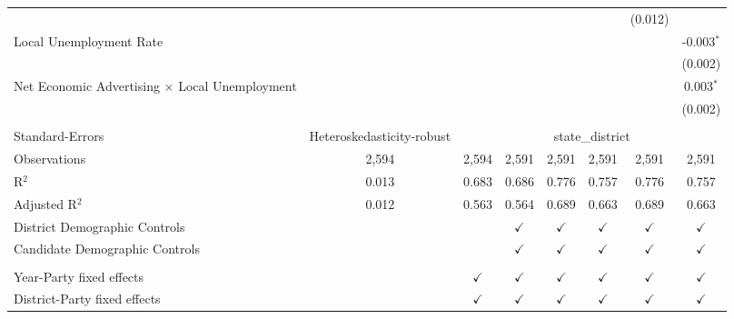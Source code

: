\begin{table}[htbp]
\begin{tabular}{lccccccc}
                                                    &               &               &               &               &               & (0.012)       &   \\   
      Local Unemployment Rate                       &               &               &               &               &               &               & -0.003$^{*}$\\   
                                                    &               &               &               &               &               &               & (0.002)\\   
      Net Economic Advertising × Local Unemployment &               &               &               &               &               &               & 0.003$^{*}$\\   
                                                    &               &               &               &               &               &               & (0.002)\\   
       \\
      Standard-Errors & Heteroskedasticity-robust & \multicolumn{6}{c}{state\_district} \\ 
      Observations                                  & 2,594         & 2,594         & 2,591         & 2,591         & 2,591         & 2,591         & 2,591\\  
      R$^2$                                         & 0.013         & 0.683         & 0.686         & 0.776         & 0.757         & 0.776         & 0.757\\  
      Adjusted R$^2$                                & 0.012         & 0.563         & 0.564         & 0.689         & 0.663         & 0.689         & 0.663\\  
      District Demographic Controls                 &               &               & $\checkmark$  & $\checkmark$  & $\checkmark$  & $\checkmark$  & $\checkmark$\\   
      Candidate Demographic Controls                &               &               & $\checkmark$  & $\checkmark$  & $\checkmark$  & $\checkmark$  & $\checkmark$\\   
       \\
      Year-Party fixed effects                      &               & $\checkmark$  & $\checkmark$  & $\checkmark$  & $\checkmark$  & $\checkmark$  & $\checkmark$\\   
      District-Party fixed effects                  &               & $\checkmark$  & $\checkmark$  & $\checkmark$  & $\checkmark$  & $\checkmark$  & $\checkmark$\\   
      \bottomrule
   \end{tabular}
   

\end{table}
